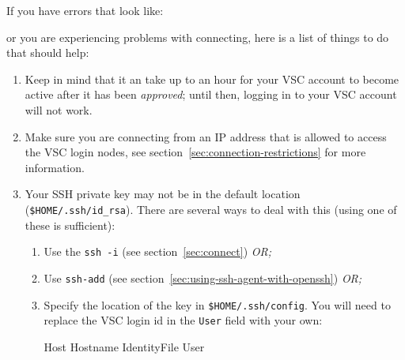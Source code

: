 If you have errors that look like:

\begin{prompt}
\end{prompt}

or you are experiencing problems with connecting, here is a list of things to do
that should help:

\begin{enumerate}
    \item Keep in mind that it an take up to an hour for your VSC account to become
        active after it has been \emph{approved}; until then, logging in to your VSC
        account will not work.
    \item Make sure you are connecting from an IP address that is allowed to access the VSC login nodes,
          see section~\ref{sec:connection-restrictions} for more information.
\ifmacORlinux
    \item Your SSH private key may not be in the default location (\lstinline|$HOME/.ssh/id_rsa|).
        There are several ways to deal with this (using one of these is sufficient):
\begin{enumerate}
            \item Use the \lstinline|ssh -i| (see section~\ref{sec:connect}) \emph{OR;}
            \item Use \lstinline|ssh-add| (see section~\ref{sec:using-ssh-agent-with-openssh}) \emph{OR;}
            \item Specify the location of the key in \lstinline|$HOME/.ssh/config|. You will
                need to replace the VSC login id in the \lstinline|User| field with your own:

            \begin{prompt}
Host %
    Hostname %
    IdentityFile %
    User %


\end{prompt}
\end{enumerate}
\end{enumerate}
